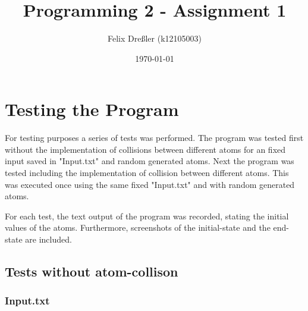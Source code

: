 \documentclass[11pt,titlepage]{article}
\title{Programming 2 - Assignment 1}
\author{Felix Dreßler (k12105003)}
\date{\today} %
\begin{document}
\maketitle
	\section{Testing the Program}
		For testing purposes a series of tests was performed. The program was tested first without the implementation of collisions between different atoms for an fixed input saved in "Input.txt" and random generated atoms.
		Next the program was tested including the implementation of collision between different atoms. This was executed once using the same fixed "Input.txt" and with random generated atoms.
		
		For each test, the text output of the program was recorded, stating the initial values of the atoms. Furthermore, screenshots of the initial-state and the end-state are included.
		\subsection{Tests without atom-collison}
			\subsubsection{Input.txt}
			
\end{document}
